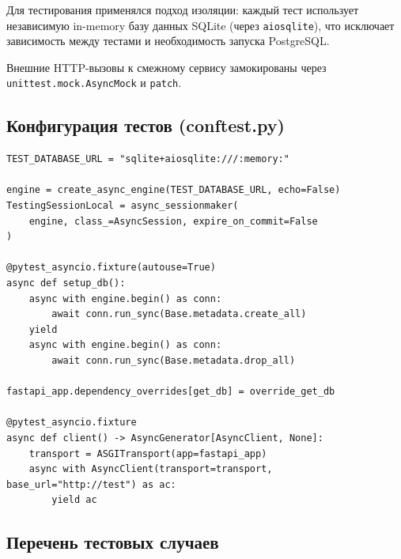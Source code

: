 \documentclass[12pt,a4paper]{article}
\begin{document}
Для тестирования применялся подход изоляции: каждый тест использует
независимую in-memory базу данных SQLite (через \texttt{aiosqlite}), что
исключает зависимость между тестами и необходимость запуска PostgreSQL.

Внешние HTTP-вызовы к смежному сервису замокированы через
\texttt{unittest.mock.AsyncMock} и \texttt{patch}.

\subsection{Конфигурация тестов (conftest.py)}

\begin{lstlisting}[caption={Фикстуры coordination\_service/tests/conftest.py}]
TEST_DATABASE_URL = "sqlite+aiosqlite:///:memory:"

engine = create_async_engine(TEST_DATABASE_URL, echo=False)
TestingSessionLocal = async_sessionmaker(
    engine, class_=AsyncSession, expire_on_commit=False
)

@pytest_asyncio.fixture(autouse=True)
async def setup_db():
    async with engine.begin() as conn:
        await conn.run_sync(Base.metadata.create_all)
    yield
    async with engine.begin() as conn:
        await conn.run_sync(Base.metadata.drop_all)

fastapi_app.dependency_overrides[get_db] = override_get_db

@pytest_asyncio.fixture
async def client() -> AsyncGenerator[AsyncClient, None]:
    transport = ASGITransport(app=fastapi_app)
    async with AsyncClient(transport=transport, base_url="http://test") as ac:
        yield ac
\end{lstlisting}

\subsection{Перечень тестовых случаев}
\end{document}
